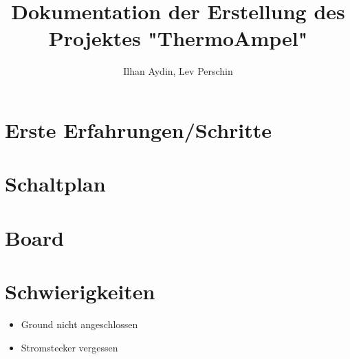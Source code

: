 \documentclass[]{article}
\title{Dokumentation der Erstellung des Projektes "ThermoAmpel"}
\author{Ilhan Aydin, Lev Perschin}
\begin{document}
\maketitle
\newpage
\begin{abstract}

\end{abstract}
\newpage
\section{Erste Erfahrungen/Schritte}
\section{Schaltplan}
\section{Board}
\section{Schwierigkeiten}
\begin{itemize}
	\item Ground nicht angeschlossen
	\item Stromstecker vergessen
\end{itemize}
\end{document}
